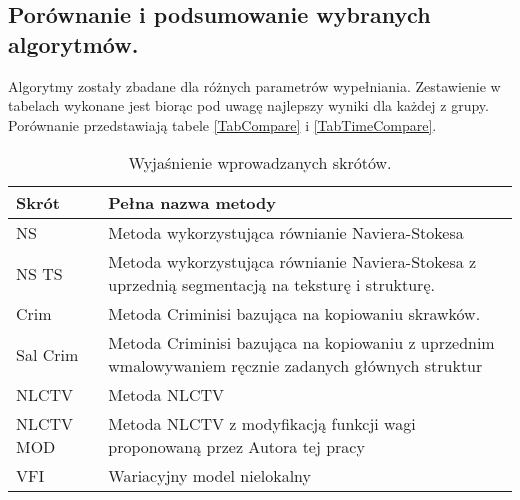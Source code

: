\documentclass[a4paper,12pt,twoside,openany]{report}
\begin{document}
\subsection{Porównanie i podsumowanie wybranych algorytmów.}
Algorytmy zostały zbadane dla różnych parametrów wypełniania. Zestawienie w tabelach wykonane jest biorąc pod uwagę najlepszy wyniki dla każdej z grupy. Porównanie przedstawiają tabele \ref{TabCompare} 
i \ref{TabTimeCompare}.
\begin{table}
    \centering
    \begin{tabular}{|p{4cm}|p{9cm}|}
        \hline
         Skrót & Pełna nazwa metody \\ \hline \hline
         NS    & Metoda wykorzystująca równianie Naviera-Stokesa \\ \hline
         NS TS    & Metoda wykorzystująca równianie Naviera-Stokesa z uprzednią segmentacją na teksturę i strukturę. \\ \hline
         Crim    & Metoda Criminisi bazująca na kopiowaniu skrawków. \\ \hline
         Sal Crim    & Metoda Criminisi bazująca na kopiowaniu z uprzednim wmalowywaniem ręcznie zadanych głównych struktur \\ \hline
         NLCTV    & Metoda NLCTV \\ \hline
         NLCTV MOD   & Metoda NLCTV z modyfikacją funkcji wagi proponowaną przez Autora tej pracy \\ \hline
         VFI   & Wariacyjny model nielokalny \\ \hline
    \end{tabular}
    \caption{Wyjaśnienie wprowadzanych skrótów.}
\end{table}
\end{document}
